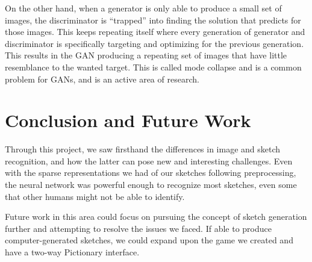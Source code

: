 \documentclass[10pt,twocolumn,letterpaper]{article}
\begin{document}
On the other hand, when a generator is only able to produce a small set of images, the discriminator is “trapped” into finding the solution that predicts for those images. This keeps repeating itself where every generation of generator and discriminator is specifically targeting and optimizing for the previous generation. This results in the GAN producing a repeating set of images that have little resemblance to the wanted target. This is  called mode collapse and is a common problem for GANs, and is an active area of research.

\section{Conclusion and Future Work}

Through this project, we saw firsthand the differences in image and sketch recognition, and how the latter can pose new and interesting challenges. Even with the sparse representations we had of our sketches following preprocessing, the neural network was powerful enough to recognize  most sketches, even some that other humans might not be able to identify.

Future work in this area could focus on pursuing the concept of sketch generation further and attempting to resolve the issues we faced. If able to produce computer-generated sketches, we could expand upon the game we created and have a two-way Pictionary interface.

{\small
  
  
}
\end{document}
